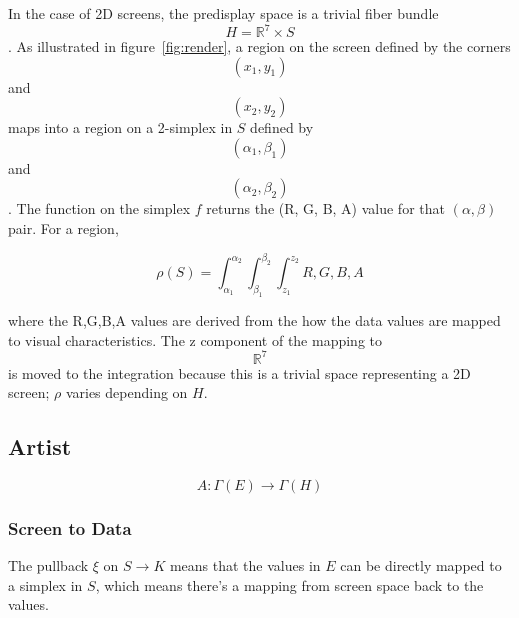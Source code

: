 \documentclass[../intro.tex]{subfiles}
\begin{document}
In the case of 2D screens, the predisplay space is a trivial fiber bundle $$H=\mathbb{R}^{7}\times S$$. As illustrated in figure~\ref{fig:render}, a region on the screen defined by the corners $$(x_1, y_1)$$ and $$(x_2, y_2)$$ maps into a region on a 2-simplex in $S$ defined by $$(\alpha_1, \beta_1)$$ and $$(\alpha_2, \beta_2)$$. The function on the simplex $f$ returns the (R, G, B, A) value for that $(\alpha, \beta)$ pair. For a region, 

\begin{equation*}
\rho(S) = \int_{\alpha_1}^{\alpha_2}\int_{\beta_1}^{\beta_2}\int_{z_1}^{z_2}{R, G, B, A}  
\end{equation*}

where the R,G,B,A values are derived from the how the data values are mapped to visual characteristics. The z component of the mapping to $$\mathbb{R}^7$$ is moved to the integration because this is a trivial space representing a 2D screen; $\rho$ varies depending on $H$. 


\subsection{Artist}
\begin{equation}
    A: \Gamma(E) \rightarrow \Gamma(H)
\end{equation}

\subsubsection{Screen to Data}

The pullback $\xi$ on $S \rightarrow K$ means that the values in $E$ can be directly mapped to a simplex in $S$, which means there's a mapping from screen space back to the values. 

\end{document}
